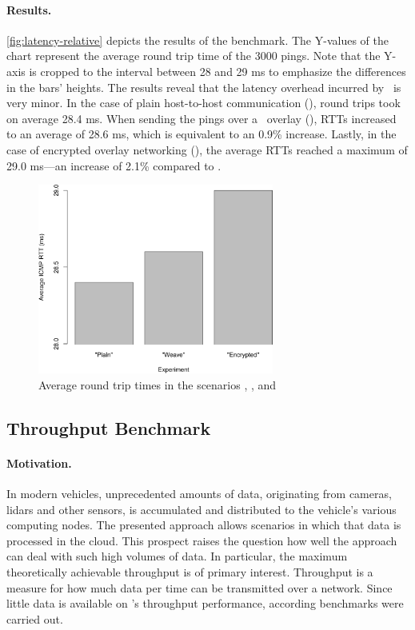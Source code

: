 \paragraph{Results.} \autoref{fig:latency-relative} depicts the results of the benchmark. The Y-values of the chart represent the average round trip time of the 3000 pings. Note that the Y-axis is cropped to the interval between 28 and 29 ms to emphasize the differences in the bars' heights. The results reveal that the latency overhead incurred by \wnet\ is very minor. In the case of plain host-to-host communication (), round trips took on average 28.4 ms. When sending the pings over a \weave\ overlay (), RTTs increased to an average of 28.6 ms, which is equivalent to an 0.9\% increase. Lastly, in the case of encrypted overlay networking (), the average RTTs reached a maximum of 29.0 ms---an increase of 2.1\% compared to .
\begin{figure}[htpb]
  \centering
  \includegraphics[width=0.69\textwidth]{figures/ping-bar}
  \caption[\weave\ latency experiment results]{Average round trip times in the scenarios , , and }\label{fig:latency-relative}
\end{figure}
%
%
%
%
%
%
%
%
%
%
\subsection{Throughput Benchmark} \label{sec:throughput}
\paragraph{Motivation.} 
In modern vehicles, unprecedented amounts of data, originating from cameras, lidars and other sensors, is accumulated and distributed to the vehicle's various computing nodes. The presented approach allows scenarios in which that data is processed in the cloud. This prospect raises the question how well the approach can deal with such high volumes of data. In particular, the maximum theoretically achievable throughput is of primary interest. Throughput is a measure for how much data per time can be transmitted over a network. Since little data is available on \wnet 's throughput performance, according benchmarks were carried out.

